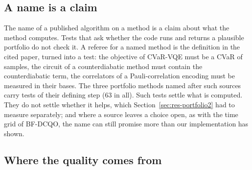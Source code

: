 \documentclass[11pt,a4paper]{article}
\begin{document}
\subsection{A name is a claim}

The name of a published algorithm on a method is a claim about what the
method computes. Tests that ask whether the code runs and returns a
plausible portfolio do not check it. A referee for a named method is the
definition in the cited paper, turned into a test: the objective of
CVaR-VQE must be a
CVaR of samples, the circuit of a counterdiabatic method must contain the
counterdiabatic term, the correlators of a Pauli-correlation encoding must
be measured in their bases. The three portfolio methods named after such
sources carry tests of their defining step (63 in all). Such tests settle
what is
computed. They do not settle whether it helps, which
Section~\ref{sec:res-portfolio2} had to measure separately; and where a
source leaves a choice open, as with the time grid of BF-DCQO, the name can
still promise more than our implementation has shown.

\subsection{Where the quality comes from}
\end{document}
